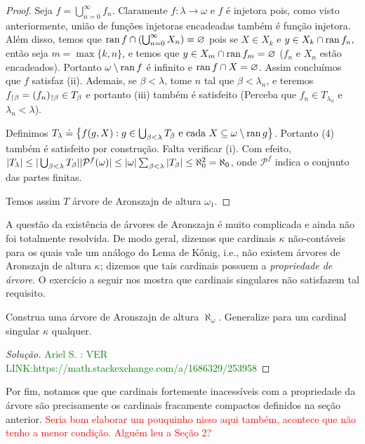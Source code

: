 \documentclass[a4paper]{article}
\begin{document}
\begin{proof}
   Seja \(f = \bigcup_{n = 0}^{\infty}f_n\). Claramente \(f\colon
   \lambda\to \omega\) e  \(f\) é injetora pois, como visto anteriormente, união de funções injetoras encadeadas também é função injetora. Além disso, temos que \(\operatorname{ran} f \cap (\bigcup_{n = 0}^{\infty} X_n)
   = \varnothing\) pois se \(X\in X_k\) e \(y\in X_k\cap\operatorname{ran} f_n,\) então seja \(m=\max\{k,n\}\), e temos que \(y\in X_m\cap\operatorname{ran} f_m=\varnothing\) (\(f_n\) e \(X_n\) estão encadeados). Portanto \(\omega\setminus\operatorname{ran} f\) é infinito e \(\operatorname{ran} f \cap X =
   \varnothing\). Assim concluímos que \(f\) satisfaz (ii). Ademais, se  \(\beta <
   \lambda\), tome \(n\) tal que \(\beta < \lambda_n\), e teremos \(f_{\upharpoonright \beta}= (f_{n})_{\upharpoonright \beta}\in T_\beta\) e portanto (iii) também é satisfeito (Perceba que \(f_n\in T_{\lambda_n}\) e \(\lambda_n<\lambda\)).
   
   Definimos \(T_\lambda\doteq\big\{f(g,X) : g\in\bigcup_{\beta < \lambda} T_{\beta}\text{ e cada } X \subseteq \omega\setminus\operatorname{ran} g\big\}\). Portanto (4) também é satisfeito por construção. Falta verificar (i). Com efeito, \(\vert T_\lambda \vert\leq\vert \bigcup_{\beta<\lambda}T_{\beta} \vert\vert \mathcal P^f(\omega) \vert \le \vert \omega \vert\sum_{\beta<\lambda}|T_{\beta}| \le \aleph_0^2=\aleph_0\), onde \(\mathcal P^f\) indica o conjunto das partes finitas.
   
   Temos assim \(T\) árvore de Aronszajn de altura \(\omega_1\).

\end{proof}

 A questão da existência de árvores de Aronszajn é muito complicada e ainda não
 foi totalmente resolvida. De modo geral, dizemos que cardinais \(\kappa\)
 não-contáveis para os quais vale um  análogo do Lema de Kőnig, i.e., não
 existem árvores  de Aronszajn de altura $\kappa$; dizemos que tais cardinais
 possuem a  \textit{propriedade de árvore}. O exercício a seguir nos mostra que
 cardinais singulares não satisfazem tal requisito.

 \begin{exercicio}
  Construa uma árvore de Aronszajn de altura \(\aleph_{\omega}\). Generalize
  para um cardinal singular \(\kappa\) qualquer.
\end{exercicio}
\begin{proof}[Solução]
\textcolor{green}{Ariel S. : VER LINK:https://math.stackexchange.com/a/1686329/253958}
\end{proof}

 Por fim, notamos que que cardinais
 fortemente inacessíveis com a propriedade da árvore são precisamente os
 cardinais fracamente compactos definidos na seção anterior.
 \textcolor{red}{Seria bom elaborar um pouquinho nisso aqui também, acontece
   que não tenho a menor condição. Alguém leu a Seção 2?}

  
  
\end{document}
